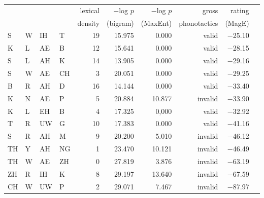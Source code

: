 \begin{longtable}{l@{ } l@{ } l@{ } l r r r r r r} 
\toprule
  &   &    &     & lexical & $-$log $p$ & $-$log $p$ & gross & rating \\
&&&& density & (bigram) & (MaxEnt) & phonotactics & (MagE) \\
\midrule
S  & W & IH & T  & 19 & 15.975 & 0.000  & valid   & $-$25.10 \\
K  & L & AE & B  & 12 & 15.641 & 0.000  & valid   & $-$28.15 \\
S  & L & AH & K  & 14 & 13.905 & 0.000  & valid   & $-$29.16 \\
S  & W & AE & CH &  3 & 20.051 & 0.000  & valid   & $-$29.25 \\
B  & R & AH & D  & 16 & 14.144 & 0.000  & valid   & $-$33.40 \\
K  & N & AE & P  &  5 & 20.884 & 10.877 & invalid & $-$33.90 \\
K  & L & EH & B  &  4 & 17.325 & 0,000  & valid   & $-$32.92 \\
T  & R & UW & G  & 10 & 17.383 & 0.000  & valid   & $-$41.16 \\
S  & R & AH & M  &  9 & 20.200 & 5.010  & invalid & $-$46.12 \\
TH & Y & AH & NG &  1 & 23.470 & 10.121 & invalid & $-$46.49 \\
TH & W & AE & ZH &  0 & 27.819 & 3.876  & invalid & $-$63.19 \\
ZH & R & IH & K  &  8 & 29.197 & 13.640 & invalid & $-$67.59 \\
CH & W & UW & P  &  2 & 29.071 & 7.467  & invalid & $-$87.97 \\
\bottomrule
\end{longtable}
